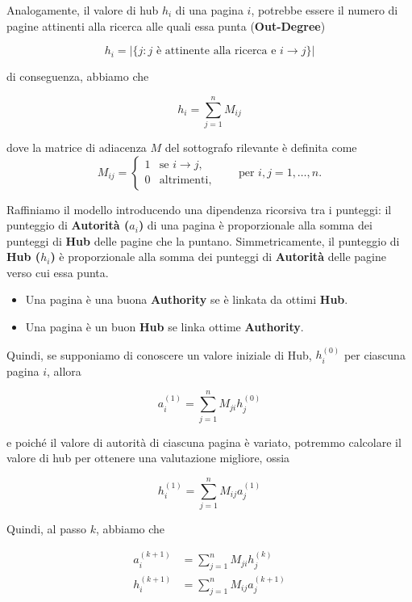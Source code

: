 Analogamente, il valore di hub $h_i$ di una pagina $i$, potrebbe essere il numero di pagine attinenti alla ricerca alle quali essa punta (\textbf{Out-Degree})

\[
    h_i = |\{j: j \text{ è attinente alla ricerca e } i \rightarrow j\}|
\]

di conseguenza, abbiamo che

\[
h_i = \sum_{j=1}^n M_{ij}
\]

dove la matrice di adiacenza $M$ del sottografo rilevante è definita come
\[
M_{ij} =
\begin{cases}
1 & \text{se } i \rightarrow j,\\[4pt]
0 & \text{altrimenti,}
\end{cases}
\qquad\text{per } i,j = 1,\dots,n.
\]


Raffiniamo il modello introducendo una dipendenza ricorsiva tra i punteggi: il punteggio di \textbf{Autorità ($a_i$)} di una pagina è proporzionale alla somma dei punteggi di \textbf{Hub} delle pagine che la puntano. Simmetricamente, il punteggio di \textbf{Hub ($h_i$)} è proporzionale alla somma dei punteggi di \textbf{Autorità} delle pagine verso cui essa punta.

\begin{itemize}
    \item Una pagina è una buona \textbf{Authority} se è linkata da ottimi \textbf{Hub}.
    \item Una pagina è un buon \textbf{Hub} se linka ottime \textbf{Authority}.
\end{itemize}

Quindi, se supponiamo di conoscere un valore iniziale di Hub, $h_i^{(0)}$ per ciascuna pagina $i$, allora

\[
a_i^{(1)} = \sum_{j=1}^n M_{ji} h_j^{(0)}
\]

e poiché il valore di autorità di ciascuna pagina è variato, potremmo calcolare il valore di hub per ottenere una valutazione migliore, ossia

\[
h_i^{(1)} = \sum_{j=1}^n M_{ij} a_j^{(1)}
\]

Quindi, al passo $k$, abbiamo che

\begin{equation}\label{eq:auth_and_hub}
\begin{split}
    a_i^{(k+1)} &= \sum_{j=1}^n M_{ji} h_j^{(k)} \\
    h_i^{(k+1)} &= \sum_{j=1}^n M_{ij} a_j^{(k+1)}
\end{split}
\end{equation}

